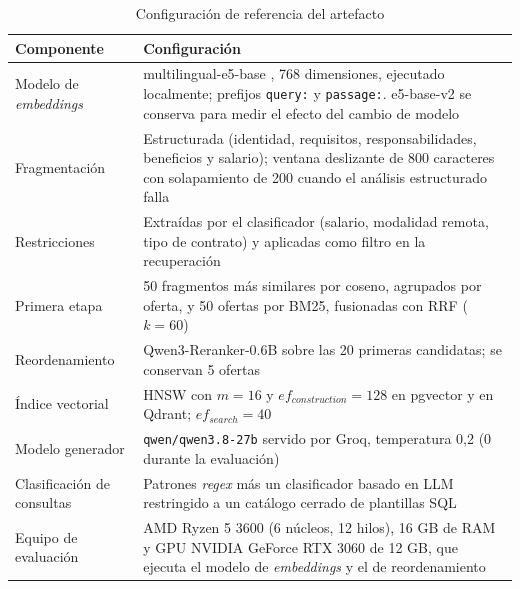 \begin{table}[htbp!]
    \centering
    \caption{Configuración de referencia del artefacto}
    \label{tab:art-config}
    \small
    \begin{tabular}{|p{4.4cm}|p{9.8cm}|}
        \hline
        \textbf{Componente} & \textbf{Configuración} \\
        \hline
        Modelo de \textit{embeddings} & multilingual-e5-base \citep{Wang2024mE5}, 768 dimensiones, ejecutado localmente; prefijos \texttt{query:} y \texttt{passage:}. e5-base-v2 \citep{Wang2022E5} se conserva para medir el efecto del cambio de modelo \\
        \hline
        Fragmentación & Estructurada (identidad, requisitos, responsabilidades, beneficios y salario); ventana deslizante de 800 caracteres con solapamiento de 200 cuando el análisis estructurado falla \\
        \hline
        Restricciones & Extraídas por el clasificador (salario, modalidad remota, tipo de contrato) y aplicadas como filtro en la recuperación \\
        \hline
        Primera etapa & 50 fragmentos más similares por coseno, agrupados por oferta, y 50 ofertas por BM25, fusionadas con RRF ($k = 60$) \\
        \hline
        Reordenamiento & Qwen3-Reranker-0.6B \citep{Zhang2025Qwen3} sobre las 20 primeras candidatas; se conservan 5 ofertas \\
        \hline
        Índice vectorial & HNSW con $m=16$ y $ef_{construction}=128$ en pgvector y en Qdrant; $ef_{search}=40$ \\
        \hline
        Modelo generador & \texttt{qwen/qwen3.8-27b} servido por Groq, temperatura 0,2 (0 durante la evaluación) \\
        \hline
        Clasificación de consultas & Patrones \textit{regex} más un clasificador basado en LLM restringido a un catálogo cerrado de plantillas SQL \\
        \hline
        Equipo de evaluación & AMD Ryzen 5 3600 (6 núcleos, 12 hilos), 16 GB de RAM y GPU NVIDIA GeForce RTX 3060 de 12 GB, que ejecuta el modelo de \textit{embeddings} y el de reordenamiento \\
        \hline
    \end{tabular}
\end{table}

